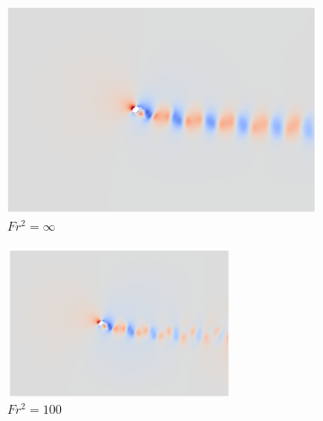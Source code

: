 \begin{figure}
    \centering
    \begin{subfigure}[b]{0.32\textwidth}
        \centering
        \includegraphics[width=\textwidth]{images/spinning_ellipse/ar1p5fsinf.png}
        \caption{$Fr^2 = \infty$}
        \label{fig:ar0p5fsinf}
    \end{subfigure}
    \hfill
    \begin{subfigure}[b]{0.32\textwidth}
        \centering
        \includegraphics[width=\textwidth]{images/spinning_ellipse/ar1p5fr10.png}
        \caption{$Fr^2 = 100$}
        \label{fig:ar1p5fr10}
    \end{subfigure}
    \hfill
    \begin{subfigure}[b]{0.32\textwidth}
        \centering

\end{subfigure}
\end{figure}
